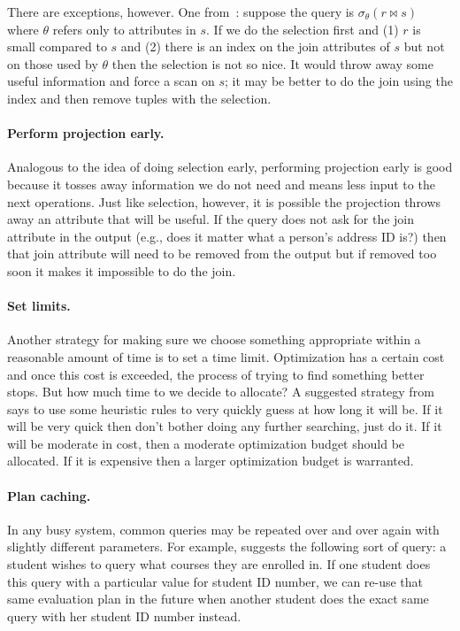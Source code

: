 \documentclass[a4paper]{report}
\begin{document}
There are exceptions, however. One from~\cite{dsc}: suppose the query is $\sigma_{\theta}( r \bowtie s )$ where $\theta$ refers only to attributes in $s$. If we do the selection first and (1) $r$ is small compared to $s$ and (2) there is an index on the join attributes of $s$ but not on those used by $\theta$ then the selection is not so nice. It would throw away some useful information and force a scan on $s$; it may be better to do the join using the index and then remove tuples with the selection.

\paragraph{Perform projection early.} Analogous to the idea of doing selection early, performing projection early is good because it tosses away information we do not need and means less input to the next operations. Just like selection, however, it is possible the projection throws away an attribute that will be useful. If the query does not ask for the join attribute in the output (e.g., does it matter what a person's address ID is?) then that join attribute will need to be removed from the output but if removed too soon it makes it impossible to do the join.

\paragraph{Set limits.} Another strategy for making sure we choose something appropriate within a reasonable amount of time is to set a time limit. Optimization has a certain cost and once this cost is exceeded, the process of trying to find something better stops. But how much time to we decide to allocate? A suggested strategy from~\cite{dsc} says to use some heuristic rules to very quickly guess at how long it will be. If it will be very quick then don't bother doing any further searching, just do it. If it will be moderate in cost, then a moderate optimization budget should be allocated. If it is expensive then a larger optimization budget is warranted.

\paragraph{Plan caching.} In any busy system, common queries may be repeated over and over again with slightly different parameters. For example, \cite{dsc} suggests the following sort of query: a student wishes to query what courses they are enrolled in. If one student does this query with a particular value for student ID number, we can re-use that same evaluation plan in the future when another student does the exact same query with her student ID number instead. 
\end{document}
